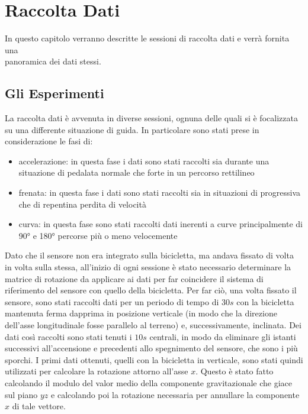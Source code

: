 \documentclass[class=article]{standalone}
\begin{document}
	\section{Raccolta Dati}
	In questo capitolo verranno descritte le sessioni di raccolta dati e verrà fornita una \\panoramica dei dati stessi.
	
	\subsection{Gli Esperimenti}
	La raccolta dati è avvenuta in diverse sessioni, ognuna delle quali si è focalizzata su una differente situazione di guida. In particolare sono stati prese in considerazione le fasi di:
	\begin{itemize}
		\item accelerazione: in questa fase i dati sono stati raccolti sia durante una situazione di pedalata normale che forte in un percorso rettilineo
		\item frenata: in questa fase i dati sono stati raccolti sia in situazioni di progressiva che di repentina perdita di velocità
		\item curva: in questa fase sono stati raccolti dati inerenti a curve principalmente di 90° e 180° percorse più o meno velocemente
	\end{itemize}
	
	Dato che il sensore non era integrato sulla bicicletta, ma andava fissato di volta in volta sulla stessa, all'inizio di ogni sessione è stato necessario determinare la matrice di rotazione da applicare ai dati per far coincidere il sistema di riferimento del sensore con quello della bicicletta. Per far ciò, una volta fissato il sensore, sono stati raccolti dati per un periodo di tempo di \(30s\) con la bicicletta mantenuta ferma dapprima in posizione verticale (in modo che la direzione dell'asse longitudinale fosse parallelo al terreno) e, successivamente, inclinata. Dei dati così raccolti sono stati tenuti i \(10s\) centrali, in modo da eliminare gli istanti successivi all'accensione e precedenti allo spegnimento del sensore, che sono i più sporchi. I primi dati ottenuti, quelli con la bicicletta in verticale, sono stati quindi utilizzati per calcolare la rotazione attorno all'asse \(x\). Questo è stato fatto calcolando il modulo del valor medio della componente gravitazionale che giace sul piano \(yz\) e calcolando poi la rotazione necessaria per annullare la componente \(x\) di tale vettore.
	
\end{document}
